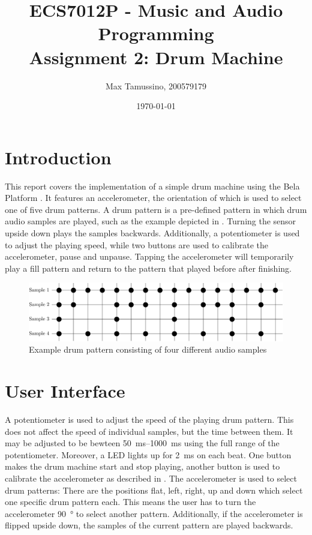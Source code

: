 \documentclass[a4paper, 12pt]{article}
\title{ECS7012P - Music and Audio Programming\\
	   Assignment 2: Drum Machine}
\author{
  Max Tamussino, 200579179
}
\date{\today}
\begin{document}
\maketitle
\tableofcontents
\pagebreak

\section{Introduction} \label{sec:intro}
This report covers the implementation of a simple drum machine using the Bela Platform \cite{McPherson2015}. It features an accelerometer, the orientation of which is used to select one of five drum patterns. A drum pattern is a pre-defined pattern in which drum audio samples are played, such as the example depicted in . Turning the sensor upside down plays the samples backwards. Additionally, a potentiometer is used to adjust the playing speed, while two buttons are used to calibrate the accelerometer, pause and unpause. Tapping the accelerometer will temporarily play a fill pattern and return to the pattern that played before after finishing.

\begin{figure}[h!]
	\centering
	\includegraphics[width=\textwidth]{patterns.png}
	\caption{Example drum pattern consisting of four different audio samples}
	\label{fig:drum-patterns}
\end{figure}

\section{User Interface}
A potentiometer is used to adjust the speed of the playing drum pattern. This does not affect the speed of individual samples, but the time between them. It may be adjusted to be bewteen \SIrange{50}{1000}{\milli\second} using the full range of the potentiometer. Moreover, a LED lights up for \SI{2}{\milli\second} on each beat. One button makes the drum machine start and stop playing, another button is used to calibrate the accelerometer as described in . The accelerometer is used to select drum patterns: There are the positions flat, left, right, up and down which select one specific drum pattern each. This means the user has to turn the accelerometer \SI{90}{\degree} to select another pattern. Additionally, if the accelerometer is flipped upside down, the samples of the current pattern are played backwards.
\end{document}
